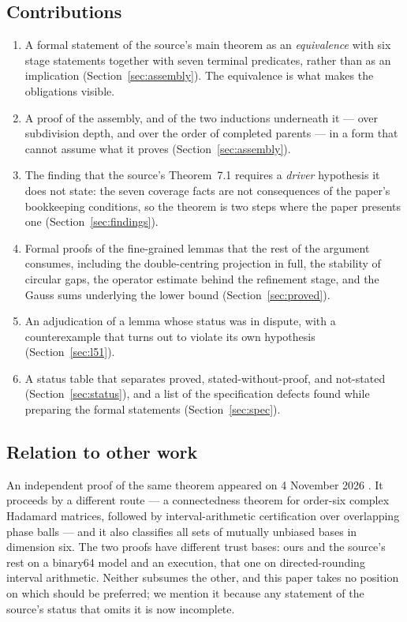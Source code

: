 \documentclass[11pt]{article}
\theoremstyle{definition}
\begin{document}
\subsection{Contributions}

\begin{enumerate}[label=\textbf{C\arabic*.}]
\item A formal statement of the source's main theorem as an \emph{equivalence} with six stage
      statements together with seven terminal predicates, rather than as an implication
      (Section~\ref{sec:assembly}). The equivalence is what makes the obligations visible.
\item A proof of the assembly, and of the two inductions underneath it --- over subdivision depth,
      and over the order of completed parents --- in a form that cannot assume what it proves
      (Section~\ref{sec:assembly}).
\item The finding that the source's Theorem~7.1 requires a \emph{driver} hypothesis it does not
      state: the seven coverage facts are not consequences of the paper's bookkeeping conditions,
      so the theorem is two steps where the paper presents one (Section~\ref{sec:findings}).
\item Formal proofs of the fine-grained lemmas that the rest of the argument consumes, including
      the double-centring projection in full, the stability of circular gaps, the operator
      estimate behind the refinement stage, and the Gauss sums underlying the lower bound
      (Section~\ref{sec:proved}).
\item An adjudication of a lemma whose status was in dispute, with a counterexample that turns out
      to violate its own hypothesis (Section~\ref{sec:l51}).
\item A status table that separates proved, stated-without-proof, and not-stated
      (Section~\ref{sec:status}), and a list of the specification defects found while preparing the
      formal statements (Section~\ref{sec:spec}).
\end{enumerate}

\subsection{Relation to other work}

An independent proof of the same theorem appeared on 4 November 2026 \cite{WT26}. It proceeds by a
different route --- a connectedness theorem for order-six complex Hadamard matrices, followed by
interval-arithmetic certification over overlapping phase balls --- and it also classifies all sets
of mutually unbiased bases in dimension six. The two proofs have different trust bases: ours and the
source's rest on a binary64 model and an execution, that one on directed-rounding interval
arithmetic. Neither subsumes the other, and this paper takes no position on which should be
preferred; we mention it because any statement of the source's status that omits it is now
incomplete.
\end{document}
